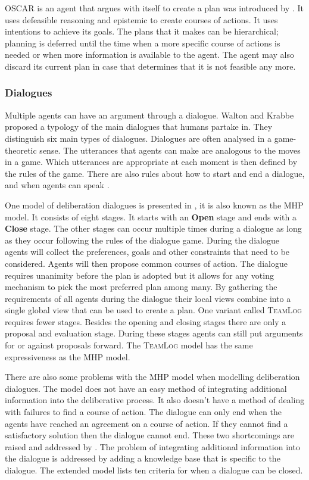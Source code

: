 OSCAR is an agent that argues with itself to create a plan was introduced by
\cite{pollock1995}. It uses defeasible reasoning and epistemic to create
courses of actions. It uses intentions to achieve its goals. The plans that it
makes can be hierarchical; planning is deferred until the time when a more
specific course of actions is needed or when more information is available to
the agent. The agent may also discard its current plan in case that determines
that it is not feasible any more.

\subsubsection{Dialogues}
Multiple agents can have an argument through a dialogue. Walton and
Krabbe \citep{walton1995} proposed a typology of the main dialogues that humans
partake in. They distinguish six main types of dialogues. Dialogues are often
analysed in a game-theoretic sense. The utterances that agents can make are
analogous to the moves in a game. Which utterances are appropriate at each
moment is then defined by the rules of the game. There are also rules about how
to start and end a dialogue, and when agents can speak
\citep{prakken2006,prakken2009,mcburney2009}.

One model of deliberation dialogues is presented in \citep{mcburney2007}, it is
also known as the MHP model. It
consists of eight stages. It starts with an \textbf{Open} stage and ends with
a \textbf{Close} stage. The other stages can occur multiple times during a
dialogue as long as they occur following the rules of the dialogue game.
During the dialogue agents will collect the preferences, goals and other
constraints that need to be considered. Agents will then propose common courses
of action. The dialogue requires unanimity before the plan is adopted but it
allows for any voting mechanism to pick the most preferred plan among many. By
gathering the requirements of all agents during the dialogue their local views
combine into a single global view that can be used to create a plan. One
variant called \textsc{TeamLog} \citep{dunin-keplicz2011} requires fewer
stages.
Besides the opening and closing stages there are only a proposal and evaluation
stage. During these stages agents can still put arguments for or against
proposals forward. The \textsc{TeamLog} model has the same expressiveness as
the MHP model.

There are also some problems with the MHP model when modelling
deliberation dialogues. The model does not have an easy method of integrating
additional information into the deliberative process. It also doesn't have a
method of dealing with failures to find a course of action. The dialogue can
only end when the agents have reached an agreement on a course of action. If
they cannot find a satisfactory solution then the dialogue cannot end. These
two shortcomings are raised and addressed by \citep{walton2014}. The problem of
integrating additional information into the dialogue is addressed by adding a
knowledge base that is specific to the dialogue. The extended model lists ten
criteria for when a dialogue can be closed.

